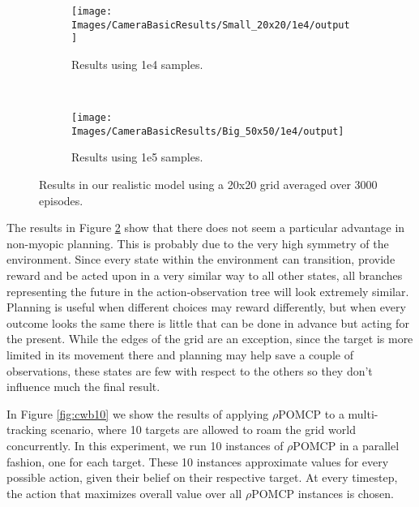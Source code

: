 \begin{figure}[ht!]
        \centering
        \begin{subfigure}[t]{0.45\textwidth}
                \texttt{[image: Images/CameraBasicResults/Small\_20x20/1e4/output]}
                \caption{Results using 1e4 samples.}
                \label{fig:cws4mb}
        \end{subfigure}%
        ~ %
        \begin{subfigure}[t]{0.45\textwidth}
                \texttt{[image: Images/CameraBasicResults/Big\_50x50/1e4/output]}
                \caption{Results using 1e5 samples.}
                \label{fig:cws5mb}
        \end{subfigure}
        \caption{Results in our realistic model using a 20x20 grid averaged over 3000 episodes.}\label{fig:cwsmb}
\end{figure}

The results in Figure \ref{fig:cws5mb} show that there does not seem a particular advantage in
non-myopic planning. This is probably due to the very high symmetry of the environment.  Since every
state within the environment can transition, provide reward and be acted upon in a very similar way
to all other states, all branches representing the future in the action-observation tree will look
extremely similar. Planning is useful when different choices may reward differently, but when every
outcome looks the same there is little that can be done in advance but acting for the present. While
the edges of the grid are an exception, since the target is more limited in its movement there and
planning may help save a couple of observations, these states are few with respect to the others so
they don't influence much the final result.

In Figure \ref{fig:cwb10} we show the results of applying $\rho$POMCP to a multi-tracking scenario, where
10 targets are allowed to roam the grid world concurrently. In this experiment, we run 10 instances
of $\rho$POMCP in a parallel fashion, one for each target. These 10 instances approximate values for
every possible action, given their belief on their respective target. At every timestep, the action that
maximizes overall value over all $\rho$POMCP instances is chosen.

